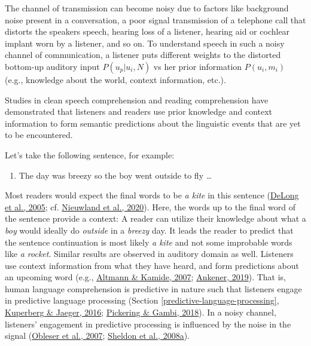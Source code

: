 \documentclass[a4paper, nobind]{templates/ociamthesis}
\providecommand{\tightlist}{%
  \setlength{\itemsep}{0pt}\setlength{\parskip}{0pt}}
\begin{document}
The channel of transmission can become noisy due to factors like background noise present in a conversation,
a poor signal transmission of a telephone call that distorts the speakers speech,
hearing loss of a listener,
hearing aid or cochlear implant worn by a listener, and so on.
To understand speech in such a noisy channel of communication, a listener puts different weights to the distorted bottom-up auditory input \(P(u_p|u_i, N)\) vs her prior information \(P(u_i, m_i)\) (e.g., knowledge about the world, context information, etc.).

Studies in clean speech comprehension and reading comprehension have demonstrated that listeners and readers use prior knowledge and context information to form semantic predictions about the linguistic events that are yet to be encountered.

Let's take the following sentence, for example:

\begin{enumerate}
\def\labelenumi{(\arabic{enumi})}
\tightlist
\item
  The day was breezy so the boy went outside to fly \ldots{}
\end{enumerate}

Most readers would expect the final words to be \emph{a kite} in this sentence (\protect\hyperlink{ref-Delong2005}{DeLong et al., 2005}; cf. \protect\hyperlink{ref-Nieuwland2020a}{Nieuwland et al., 2020}). Here, the words up to the final word of the sentence provide a context:
A reader can utilize their knowledge about what a \emph{boy} would ideally do \emph{outside} in a \emph{breezy} day.
It leads the reader to predict that the sentence continuation is most likely \emph{a kite} and not some improbable words like \emph{a rocket}.
Similar results are observed in auditory domain as well.
Listeners use context information from what they have heard, and form predictions about an upcoming word (e.g., \protect\hyperlink{ref-Altmann2007}{Altmann \& Kamide, 2007}; \protect\hyperlink{ref-Ankener2019}{Ankener, 2019}).
That is, human language comprehension is predictive in nature such that listeners engage in predictive language processing (Section \ref{predictive-language-processing}, \protect\hyperlink{ref-Kuperberg2016}{Kuperberg \& Jaeger, 2016}; \protect\hyperlink{ref-Pickering2018}{Pickering \& Gambi, 2018}).
In a noisy channel, listeners' engagement in predictive processing is influenced by the noise in the signal (\protect\hyperlink{ref-Obleser2007}{Obleser et al., 2007}; \protect\hyperlink{ref-Sheldon2008a}{Sheldon et al., 2008a}).
\end{document}
